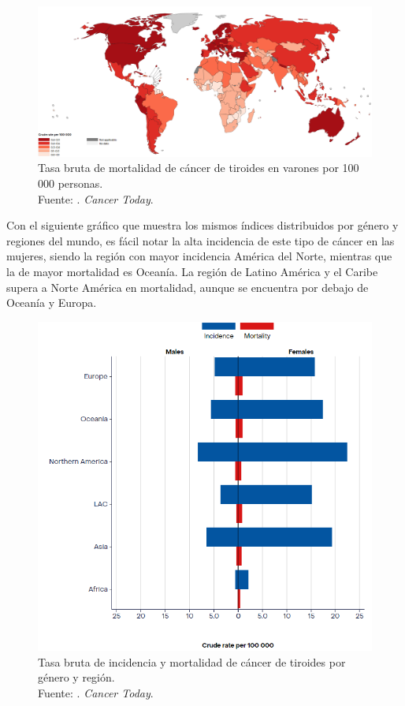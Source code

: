 \begin{figure}[H]
	\begin{center}
		\includegraphics[width=1.00 \textwidth]{1/figures/tb_mor_ct_varones.png}
		\caption[Tasa bruta de mortalidad de cáncer de tiroides en varones por 100 000 personas]{Tasa bruta de mortalidad de cáncer de tiroides en varones por 100 000 personas. \\
		Fuente: \cite{ws_oms2022cancert}. \textit{Cancer Today}.}
		\label{1:fig4}
	\end{center}
\end{figure}

Con el siguiente gráfico que muestra los mismos índices distribuidos por género y regiones del mundo, es fácil notar la alta incidencia de este tipo de cáncer en las mujeres, siendo la región con mayor incidencia América del Norte, mientras que la de mayor mortalidad es Oceanía. La región de Latino América y el Caribe supera a Norte América en mortalidad, aunque se encuentra por debajo de Oceanía y Europa.

\begin{figure}[H]
	\begin{center}
		\includegraphics[width=0.60 \textwidth]{1/figures/tb_inc_mor_gen_y_reg.png}
		\caption[Tasa bruta de incidencia y mortalidad de cáncer de tiroides por género y región]{Tasa bruta de incidencia y mortalidad de cáncer de tiroides por género y región. \\
		Fuente: \cite{ws_oms2022cancert}. \textit{Cancer Today}.}
		\label{1:fig5}
	\end{center}
\end{figure}

